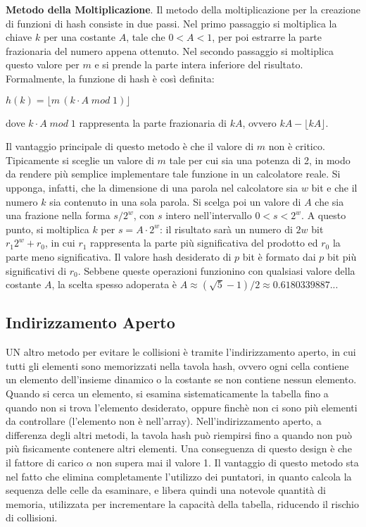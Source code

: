 \vspace{10pt}

\textbf{Metodo della Moltiplicazione}. Il metodo della moltiplicazione per la creazione di funzioni di hash consiste in due passi. Nel primo passaggio si moltiplica la chiave \(k\) per una costante \(A\), tale che \(0<A<1\), per poi estrarre la parte frazionaria del numero appena ottenuto. Nel secondo passaggio si moltiplica questo valore per \(m\) e si prende la parte intera inferiore del risultato. Formalmente, la funzione di hash è così definita:

\(h(k) = \lfloor m\,(k\cdot A\;mod\;1)\rfloor\)

\noindent dove \(k\cdot A \; mod \;1 \) rappresenta la parte frazionaria di \(kA\), ovvero \(kA-\lfloor kA\rfloor\). 

Il vantaggio principale di questo metodo è che il valore di \(m\) non è critico. Tipicamente si sceglie un valore di \(m\) tale per cui sia una potenza di 2, in modo da rendere più semplice implementare tale funzione in un calcolatore reale. Si upponga, infatti, che la dimensione di una parola nel calcolatore sia \(w\) bit e che il numero \(k\) sia contenuto in una sola parola. Si scelga poi un valore di \(A\) che sia una frazione nella forma \(s/2^w\), con \(s\) intero nell'intervallo \(0<s<2^w\). A questo punto, si moltiplica \(k\) per \(s=A\cdot 2^w\): il risultato sarà un numero di \(2w\) bit \(r_1 2^w+r_0\), in cui \(r_1\) rappresenta la parte più significativa del prodotto ed \(r_0\) la parte meno significativa. Il valore hash desiderato di \(p\) bit è formato dai \(p\) bit più significativi di \(r_0\). Sebbene queste operazioni funzionino con qualsiasi valore della costante \(A\), la scelta spesso adoperata è \(A \approx (\sqrt{5}-1)/2 \approx 0.6180339887...\)

\subsection{Indirizzamento Aperto}
UN altro metodo per evitare le collisioni è tramite l'indirizzamento aperto, in cui tutti gli elementi sono memorizzati nella tavola hash, ovvero ogni cella contiene un elemento dell'insieme dinamico o la costante  se non contiene nessun elemento. Quando si cerca un elemento, si esamina sistematicamente la tabella fino a quando non si trova l'elemento desiderato, oppure finchè non ci sono più elementi da controllare (l'elemento non è nell'array). Nell'indirizzamento aperto, a differenza degli altri metodi, la tavola hash può riempirsi fino a quando non può più fisicamente contenere altri elementi. Una conseguenza di questo design è che il fattore di carico \(\alpha\) non supera mai il valore 1. Il vantaggio di questo metodo sta nel fatto che elimina completamente l'utilizzo dei puntatori, in quanto calcola la sequenza delle celle da esaminare, e libera quindi una notevole quantità di memoria, utilizzata per incrementare la capacità della tabella, riducendo il rischio di collisioni. 

